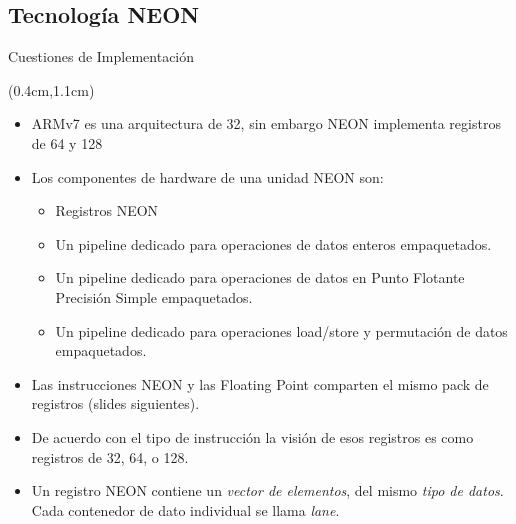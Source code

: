 \subsection{Tecnología NEON}
\begin{frame}{Cuestiones de Implementación}
 \begin{textblock*}{\textwidth}(0.4cm,1.1cm)
  \begin{itemize}[<+->]\justifying
   \item ARMv7 es una arquitectura de \SI{32}{\bit}, sin embargo NEON implementa registros de \SI{64}{\bit} y \SI{128}{\bit}
   \item Los componentes de hardware de una unidad NEON son:
   \begin{itemize}[<+->]\justifying
    \item Registros NEON
    \item Un pipeline dedicado para operaciones de datos enteros empaquetados.
    \item Un pipeline dedicado para operaciones de datos en Punto Flotante Precisión Simple empaquetados.
    \item Un pipeline dedicado para operaciones load/store y permutación de datos empaquetados.
   \end{itemize}
   \item Las instrucciones NEON y las Floating Point comparten el mismo pack de registros (slides siguientes).
   \item De acuerdo con el tipo de instrucción la visión de esos registros es como registros de \SI{32}{\bit}, \SI{64}{\bit}, o \SI{128}{\bit}.
   \item Un registro NEON contiene un \textit{vector de elementos}, del mismo \textit{tipo de datos}. Cada contenedor de dato individual se llama \textit{lane}.
  \end{itemize}
 \end{textblock*} 
\end{frame}

